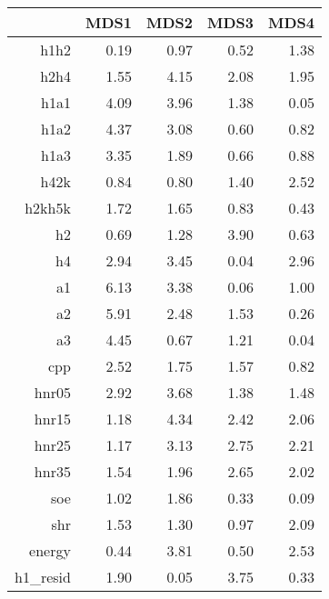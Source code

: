 \begin{table}[ht]
\centering
\begin{tabular}{rrrrr}
  \hline
 & MDS1 & MDS2 & MDS3 & MDS4 \\ 
  \hline
h1h2 & 0.19 & 0.97 & 0.52 & 1.38 \\ 
  h2h4 & 1.55 & 4.15 & 2.08 & 1.95 \\ 
  h1a1 & 4.09 & 3.96 & 1.38 & 0.05 \\ 
  h1a2 & 4.37 & 3.08 & 0.60 & 0.82 \\ 
  h1a3 & 3.35 & 1.89 & 0.66 & 0.88 \\ 
  h42k & 0.84 & 0.80 & 1.40 & 2.52 \\ 
  h2kh5k & 1.72 & 1.65 & 0.83 & 0.43 \\ 
  h2 & 0.69 & 1.28 & 3.90 & 0.63 \\ 
  h4 & 2.94 & 3.45 & 0.04 & 2.96 \\ 
  a1 & 6.13 & 3.38 & 0.06 & 1.00 \\ 
  a2 & 5.91 & 2.48 & 1.53 & 0.26 \\ 
  a3 & 4.45 & 0.67 & 1.21 & 0.04 \\ 
  cpp & 2.52 & 1.75 & 1.57 & 0.82 \\ 
  hnr05 & 2.92 & 3.68 & 1.38 & 1.48 \\ 
  hnr15 & 1.18 & 4.34 & 2.42 & 2.06 \\ 
  hnr25 & 1.17 & 3.13 & 2.75 & 2.21 \\ 
  hnr35 & 1.54 & 1.96 & 2.65 & 2.02 \\ 
  soe & 1.02 & 1.86 & 0.33 & 0.09 \\ 
  shr & 1.53 & 1.30 & 0.97 & 2.09 \\ 
  energy & 0.44 & 3.81 & 0.50 & 2.53 \\ 
  h1\_resid & 1.90 & 0.05 & 3.75 & 0.33 \\ 
   \hline
\end{tabular}
\end{table}
